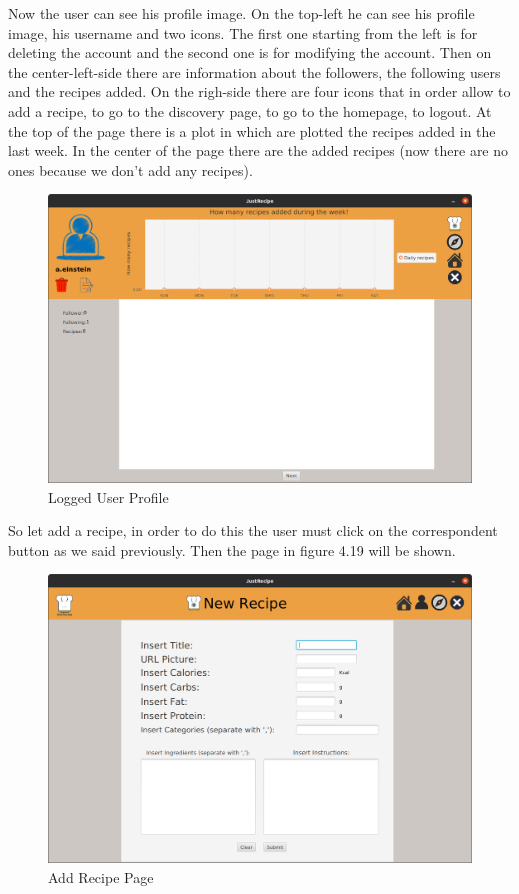 \documentclass[a4paper]{report}
\begin{document}
\noindent Now the user can see his profile image. On the top-left he can see his profile image, his username and two icons. The first one starting from the left is for deleting the account and the second one is for modifying the account. Then on the center-left-side there are information about the followers, the following users and the recipes added. On the righ-side there are four icons that in order allow to add a recipe, to go to the discovery page, to go to the homepage, to logout. At the top of the page there is a plot in which are plotted the recipes added in the last week. In  the center of the page there are the added recipes (now there are no ones because we don't add any recipes). 
\begin{figure}[htpb]
	\centering
	\includegraphics[scale=0.23]{img/user_manual/myprofile.png}
	\caption{Logged User Profile}
\end{figure}

\noindent So let add a recipe, in order to do this the user must click on the correspondent button as we said previously. Then the page in figure 4.19 will be shown.

\begin{figure}[htpb]
	\centering
	\includegraphics[scale=0.23]{img/user_manual/addrecipe.png}
	\caption{Add Recipe Page}
\end{figure}
\end{document}

